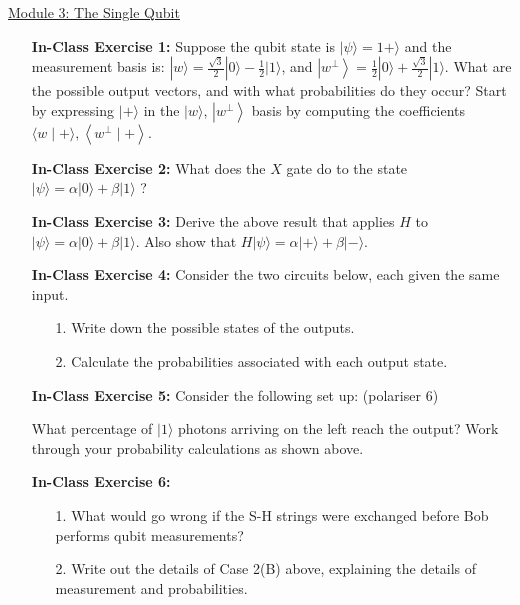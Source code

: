 \documentclass[main.tex]{subfiles}
\begin{document}
\href{https://www2.seas.gwu.edu/~simhaweb/quantum/modules/module3/module3.html}{Module 3: The Single Qubit}

\begin{enumerate}

\item[] \textbf{In-Class Exercise 1:} Suppose the qubit state is $|\psi\rangle=1+\rangle$ and the measurement basis is: $|w\rangle=\frac{\sqrt{3}}{2}|0\rangle-\frac{1}{2}|1\rangle$, and $\left|w^{\perp}\right\rangle=\frac{1}{2}|0\rangle+\frac{\sqrt{3}}{2}|1\rangle$. What are the possible output vectors, and with what probabilities do they occur? Start by expressing $|+\rangle$ in the $|w\rangle$, $\left|w^{\perp}\right\rangle$ basis by computing the coefficients $\langle w \mid+\rangle,\left\langle w^{\perp} \mid+\right\rangle$.

\item[] \textbf{In-Class Exercise 2:} What does the $X$ gate do to the state $|\psi\rangle=\alpha|0\rangle+\beta|1\rangle$ ?

\item[] \textbf{In-Class Exercise 3:} Derive the above result that applies $H$ to $|\psi\rangle=\alpha|0\rangle+\beta|1\rangle$. Also show that $H|\psi\rangle=\alpha|+\rangle+\beta|-\rangle$.

\item[] \textbf{In-Class Exercise 4:} Consider the two circuits below, each given the same input.

    \begin{enumerate}
        \item[1.] Write down the possible states of the outputs.
        \item[2.] Calculate the probabilities associated with each output state.
    \end{enumerate}

\item[] \textbf{In-Class Exercise 5:} Consider the following set up: (polariser 6)

What percentage of $|1\rangle$ photons arriving on the left reach the output? Work through your probability calculations as shown above.

\item[] \textbf{In-Class Exercise 6:}

    \begin{enumerate}
        \item[1.] What would go wrong if the S-H strings were exchanged before Bob performs qubit measurements?
        \item[2.] Write out the details of Case 2(B) above, explaining the details of measurement and probabilities.
    \end{enumerate}


\end{enumerate}
\end{document}
